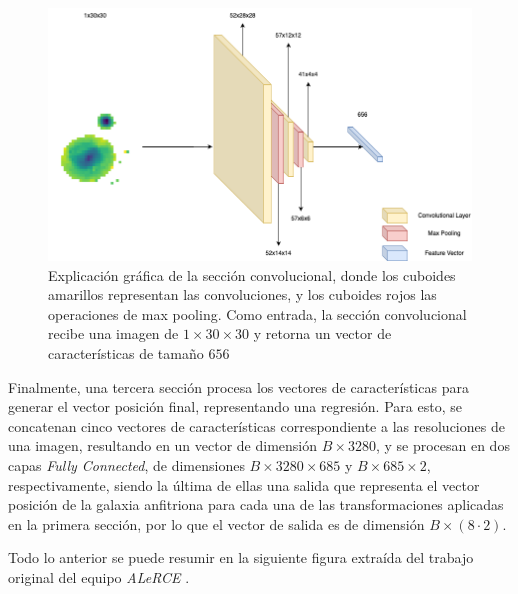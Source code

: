 \documentclass[../tesis.tex]{subfiles}
\begin{document}
\begin{figure}[h]
    \centering
    \includegraphics[width=0.63\linewidth]{images/introduction/delight_convolutional_section.png}
    \caption{Explicación gráfica de la sección convolucional, donde los cuboides amarillos representan las convoluciones, y los cuboides rojos las operaciones de max pooling. Como entrada, la sección convolucional recibe una imagen de $1\times30\times30$ y retorna un vector de características de tamaño $656$}
    \label{fig:delight-convolution-layer}
\end{figure}

Finalmente, una tercera sección procesa los vectores de características para generar el vector posición final, representando una regresión. Para esto, se concatenan cinco vectores de características correspondiente a las resoluciones de una imagen, resultando en un vector de dimensión $B\times 3280$, y se procesan en dos capas \textit{Fully Connected}, de dimensiones $B\times 3280\times 685$ y $B\times 685\times 2$, respectivamente, siendo la última de ellas una salida que representa el vector posición de la galaxia anfitriona para cada una de las transformaciones aplicadas en la primera sección, por lo que el vector de salida es de dimensión $B\times(8\cdot2)$.\par\null\par

Todo lo anterior se puede resumir en la siguiente figura extraída del trabajo original del equipo \textit{ALeRCE} \cite{delight}.\par\null\par
\end{document}
